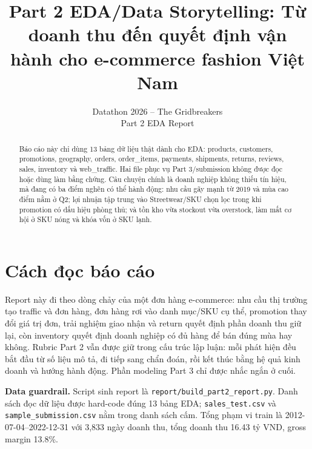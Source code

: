 \documentclass{article}
\title{Part 2 EDA/Data Storytelling: Từ doanh thu đến quyết định vận hành cho e-commerce fashion Việt Nam}
\author{Datathon 2026 -- The Gridbreakers\\Part 2 EDA Report}
\begin{document}
\maketitle

\begin{abstract}
Báo cáo này chỉ dùng 13 bảng dữ liệu thật dành cho EDA: products, customers, promotions, geography, orders, order\_items, payments, shipments, returns, reviews, sales, inventory và web\_traffic. Hai file phục vụ Part 3/submission không được đọc hoặc dùng làm bằng chứng. Câu chuyện chính là doanh nghiệp không thiếu tín hiệu, mà đang có ba điểm nghẽn có thể hành động: nhu cầu gãy mạnh từ 2019 và mùa cao điểm nằm ở Q2; lợi nhuận tập trung vào Streetwear/SKU chọn lọc trong khi promotion có dấu hiệu phòng thủ; và tồn kho vừa stockout vừa overstock, làm mất cơ hội ở SKU nóng và khóa vốn ở SKU lạnh.
\end{abstract}

\section{Cách đọc báo cáo}
Report này đi theo dòng chảy của một đơn hàng e-commerce: nhu cầu thị trường tạo traffic và đơn hàng, đơn hàng rơi vào danh mục/SKU cụ thể, promotion thay đổi giá trị đơn, trải nghiệm giao nhận và return quyết định phần doanh thu giữ lại, còn inventory quyết định doanh nghiệp có đủ hàng để bán đúng mùa hay không. Rubric Part 2 vẫn được giữ trong cấu trúc lập luận: mỗi phát hiện đều bắt đầu từ số liệu mô tả, đi tiếp sang chẩn đoán, rồi kết thúc bằng hệ quả kinh doanh và hướng hành động. Phần modeling Part 3 chỉ được nhắc ngắn ở cuối.

\textbf{Data guardrail.} Script sinh report là \texttt{report/build\_part2\_report.py}. Danh sách đọc dữ liệu được hard-code đúng 13 bảng EDA; \texttt{sales\_test.csv} và \texttt{sample\_submission.csv} nằm trong danh sách cấm. Tổng phạm vi train là 2012-07-04--2022-12-31 với 3,833 ngày doanh thu, tổng doanh thu 16.43 tỷ VND, gross margin 13.8\%.
\end{document}

